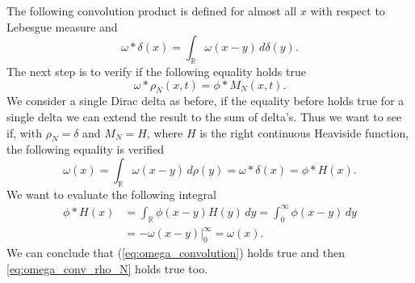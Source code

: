 \documentclass[11pt,a4paper,oneside]{amsart}
\newcommand\R{\mathbb{R}}
\begin{document}
The following convolution product is defined for almost all $x$ with respect to Lebesgue measure and
$$
\omega\ast\delta(x)=\int_\R\omega(x-y)\,d\delta(y).
$$
The next step is to verify if the following equality holds true
\begin{equation}\label{eq:omega_conv_rho_N}
\omega\ast\rho_N(x,t)=\phi\ast M_N(x,t).
\end{equation}
We consider a single Dirac delta as before, if the equality before holds true for a single delta 
we can extend the result to the sum of delta's. Thus we want to see if, with $\rho_N=\delta$ and $M_N=H$, 
where $H$ is the right continuous Heaviside function, the following equality is verified
\begin{equation}\label{eq:omega_convolution}
\omega(x)=\int_\R\omega(x-y)\,d\rho(y)=\omega\ast\delta(x)=\phi\ast H(x).
\end{equation}
We want to evaluate the following integral
\begin{align*}
\phi\ast H(x) & =\int_\R\phi(x-y)H(y)\,dy = \int_0^\infty \phi(x-y)\,dy\\
& = -\omega(x-y)|_0^\infty=\omega(x).
\end{align*}
We can conclude that (\ref{eq:omega_convolution}) holds true and then \eqref{eq:omega_conv_rho_N} holds true too.
\end{document}
